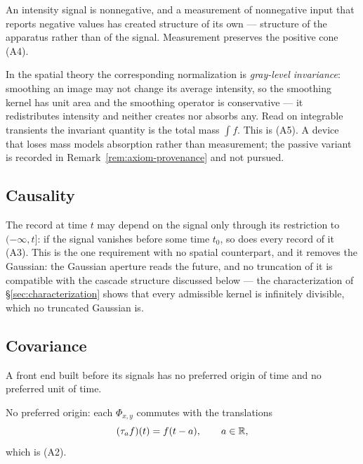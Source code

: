 An intensity signal is nonnegative, and a measurement of nonnegative input that reports
negative values has created structure of its own --- structure of the apparatus rather
than of the signal. Measurement preserves the positive cone (A4).

In the spatial theory the corresponding normalization is \emph{gray-level invariance}:
smoothing an image may not change its average intensity, so the smoothing kernel has unit
area and the smoothing operator is conservative --- it redistributes intensity and
neither creates nor absorbs any. Read on integrable transients the invariant quantity is
the total mass $\int f$. This is (A5). A device that loses mass
models absorption rather than measurement; the passive variant is recorded in
Remark~\ref{rem:axiom-provenance} and not pursued.

\subsection{Causality}\label{sec:measurement-causality}

The record at time $t$ may depend on the signal only through its restriction to
$(-\infty, t]$: if the signal vanishes before some time $t_0$, so does every record of it
(A3). This is the one requirement with no spatial counterpart, and it removes the
Gaussian: the Gaussian aperture reads the future, and no truncation of it is compatible
with the cascade structure discussed below --- the characterization of
\S\ref{sec:characterization} shows that every admissible kernel is infinitely divisible,
which no truncated Gaussian is.

\subsection{Covariance}\label{sec:measurement-covariance}

A front end built before its signals has no preferred origin of time and no preferred
unit of time.

No preferred origin: each $\Phi_{x,y}$ commutes with the translations
\[
  (\tau_a f)(t) = f(t-a), \qquad a \in \mathbb{R},
\]
which is (A2).

